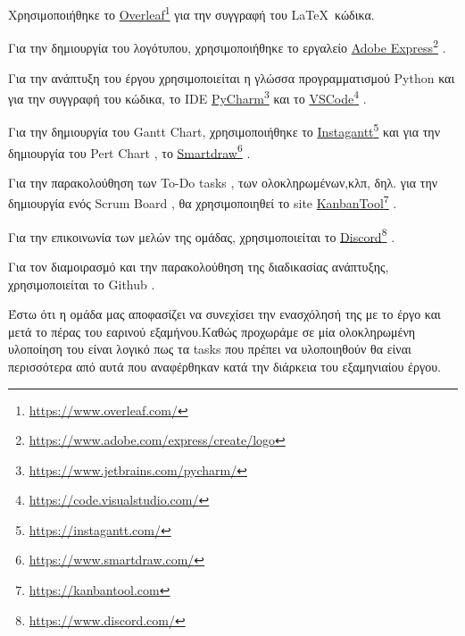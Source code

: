 \documentclass{../ol-softwaremanual}
\newcommand{\doclink}[2]{\href{#1}{#2}\footnote{\url{#1}}}
\begin{document}
	
	\vspace{20pt}
	
	
	\vspace{20pt}
	\flushleft
	Χρησιμοποιήθηκε το \en \doclink{https://www.overleaf.com/}{Overleaf} \gr για την συγγραφή του \LaTeX\ κώδικα. \break
	
	Για την δημιουργία του λογότυπου, χρησιμοποιήθηκε το εργαλείο \en \doclink{https://www.adobe.com/express/create/logo}{Adobe Express} . \gr \break
	
	Για την ανάπτυξη του έργου χρησιμοποιείται η γλώσσα προγραμματισμού \en Python \gr και για την συγγραφή του κώδικα, το \en IDE \doclink{https://www.jetbrains.com/pycharm/}{PyCharm} \gr και το \en \doclink{https://code.visualstudio.com/}{VSCode} \gr .         \\ \break
	
	Για την δημιουργία του \en Gantt Chart, \gr χρησιμοποιήθηκε το \en \doclink{https://instagantt.com/}{Instagantt} \gr και για την δημιουργία του \en Pert Chart \gr, το \en \doclink{https://www.smartdraw.com/}{Smartdraw} \gr. \break 
	
	Για την παρακολούθηση των \en To-Do tasks \gr, των ολοκληρωμένων,κλπ, δηλ. για την δημιουργία ενός \en Scrum Board \gr, θα χρησιμοποιηθεί το \en site \doclink{https://kanbantool.com}{KanbanTool} \gr. \break 
	
	Για την επικοινωνία των μελών της ομάδας, χρησιμοποιείται το \en \doclink{ https://www.discord.com/}{Discord} \gr . \linebreak 
	
	
	Για τον διαμοιρασμό και την παρακολούθηση της διαδικασίας ανάπτυξης, χρησιμοποιείται το \en Github \gr.
	
	
	
	\newpage
	
	\flushleft
	
	\vspace{20pt}
	
	Έστω ότι η ομάδα μας αποφασίζει να συνεχίσει την ενασχόλησή της με το έργο και μετά το πέρας του εαρινού εξαμήνου.Καθώς προχωράμε σε μία ολοκληρωμένη υλοποίηση του είναι λογικό πως τα \en tasks \gr που πρέπει να υλοποιηθούν θα είναι περισσότερα από αυτά που αναφέρθηκαν κατά την διάρκεια του εξαμηνιαίου έργου.
	
	\vspace{20pt}
	
\end{document}
